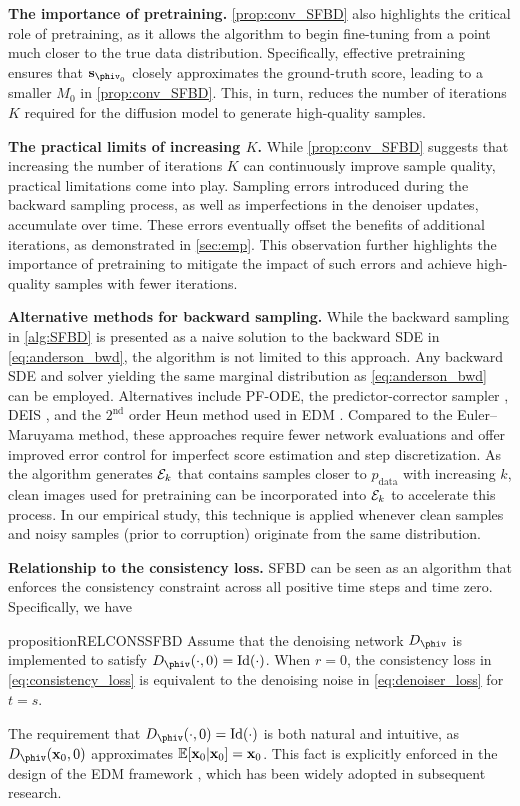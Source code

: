 \textbf{The importance of pretraining.} \cref{prop:conv_SFBD} also highlights the critical role of pretraining, as it allows the algorithm to begin fine-tuning from a point much closer to the true data distribution. Specifically, effective pretraining ensures that $\sv_{\phiv_0}$ closely approximates the ground-truth score, leading to a smaller  $M_0$  in \cref{prop:conv_SFBD}. This, in turn, reduces the number of iterations  $K$  required for the diffusion model to generate high-quality samples.

\textbf{The practical limits of increasing $K$.}  While \cref{prop:conv_SFBD} suggests that increasing the number of iterations $K$ can continuously improve sample quality, practical limitations come into play. Sampling errors introduced during the backward sampling process, as well as imperfections in the denoiser updates, accumulate over time. These errors eventually offset the benefits of additional iterations, as demonstrated in \cref{sec:emp}. This observation further highlights the importance of pretraining to mitigate the impact of such errors and achieve high-quality samples with fewer iterations.

\textbf{Alternative methods for backward sampling.} While the backward sampling in \cref{alg:SFBD} is presented as a naive solution to the backward SDE in \cref{eq:anderson_bwd}, the algorithm is not limited to this approach. Any backward SDE and solver yielding the same marginal distribution as \cref{eq:anderson_bwd} can be employed. Alternatives include PF-ODE, the predictor-corrector sampler \citep{SongDCKKEP2021}, DEIS \citep{ZhangC2023}, and the $2^\text{nd}$ order Heun method used in EDM \citep{KarrasAAL22}. Compared to the Euler–Maruyama method, these approaches require fewer network evaluations and offer improved error control for imperfect score estimation and step discretization. As the algorithm generates $\mathcal{E}_k$ that contains samples closer to $p_\text{data}$ with increasing $k$, clean images used for pretraining can be incorporated into $\mathcal{E}_k$ to accelerate this process. In our empirical study, this technique is applied whenever clean samples and noisy samples (prior to corruption) originate from the same distribution.



\textbf{Relationship to the consistency loss.} SFBD can be seen as an algorithm that enforces the consistency constraint across all positive time steps and time zero. Specifically, we have
\begin{restatable}{proposition}{RELCONSSFBD}
\label{prop:rel_btw_cons_SFBD}
Assume that the denoising network $D_{\phiv}$ is implemented to satisfy $D_{\phiv}(\cdot, 0) = \textrm{Id}(\cdot)$. When $r = 0$, the consistency loss in \cref{eq:consistency_loss} is equivalent to the denoising noise in \cref{eq:denoiser_loss} for $t = s$. 
\end{restatable}
The requirement that $D_{\phiv}(\cdot, 0) = \textrm{Id}(\cdot)$ is both natural and intuitive, as $D_{\phiv}(\xv_0, 0)$ approximates $\mathbb{E}[\mathbf{x}_0 | \mathbf{x}_0] = \mathbf{x}_0$. This fact is explicitly enforced in the design of the EDM framework \citep{KarrasAAL22}, which has been widely adopted in subsequent research.

